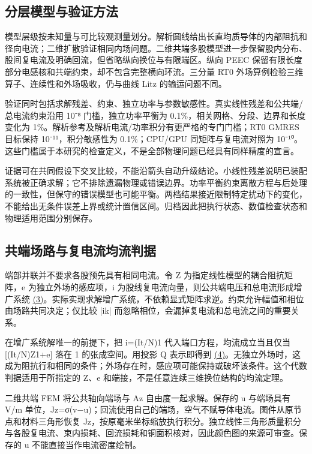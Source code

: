 \documentclass[11pt]{article}
\begin{document}
\subsection*{分层模型与验证方法}
\hypertarget{02.hierarchy.heading}{}
模型层级按未知量与可比较观测量划分。解析圆线给出长直均质导体的内部阻抗和径向电流；二维扩散验证相同内场问题。二维共端多股模型进一步保留股内分布、股间复电流及明确回流，但省略纵向换位与有限端区。纵向 PEEC 保留有限长度部分电感核和共端约束，却不包含完整横向环流。三分量 RT0 外场算例检验三维算子、连续性和外场吸收，仍与曲线 Litz 的输运问题不同。


验证同时包括求解残差、约束、独立功率与参数敏感性。真实线性残差和公共端/总电流约束沿用 10⁻⁸ 门槛，独立功率平衡为 0.1\%，相关网格、分段、边界和长度变化为 1\%。解析参考及解析电流/功率积分有更严格的专门门槛；RT0 GMRES 目标保持 10⁻¹¹，积分敏感性为 0.1\%；CPU/GPU 同矩阵与复电流对照为 10⁻¹⁰。这些门槛属于本研究的检查定义，不是全部物理问题已经具有同样精度的宣言。


证据可在共同假设下交叉比较，不能沿箭头自动升级结论。小线性残差说明已装配系统被正确求解；它不排除遗漏物理或错误边界。功率平衡约束离散方程与后处理的一致性，但保守的错误模型也可能平衡。两档结果接近限制特定扰动下的变化，不能给出无条件误差上界或统计置信区间。归档因此把执行状态、数值检查状态和物理适用范围分别保存。


\subsection*{共端场路与复电流均流判据}
\hypertarget{02.common.heading}{}
端部并联并不要求各股预先具有相同电流。令 Z 为指定线性模型的耦合阻抗矩阵，e 为独立外场的感应项，i 为股线复电流向量，则公共端电压和总电流形成增广系统 \href{paper_zh-CN_single.pdf#E04}{(3)}。实际实现求解增广系统，不依赖显式矩阵求逆。约束允许幅值和相位由场路共同决定；仅比较 |ik| 而忽略相位，会漏掉复电流和总电流之间的重要关系。


在增广系统解唯一的前提下，把 i=(It/N)1 代入端口方程，均流成立当且仅当 [(It/N)Z1+e] 落在 1 的张成空间。用投影 Q 表示即得到 \href{paper_zh-CN_single.pdf#E05}{(4)}。无独立外场时，这成为阻抗行和相同的条件；外场存在时，感应项可能保持或破坏该条件。这个代数判据适用于所指定的 Z、e 和端接，不是任意连续三维换位结构的均流定理。


二维共端 FEM 将公共轴向端场与 Az 自由度一起求解。保存的 u 与端场具有 V/m 单位，Jz=σ(v−u)；回流使用自己的端场，空气不赋导体电流。图件从原节点和材料三角形恢复 Jz，按原毫米坐标缩放执行积分。独立线性三角形质量积分与各股复电流、束内损耗、回流损耗和铜面积核对，因此颜色图的来源可审查。保存的 u 不能直接当作电流密度绘制。
\end{document}
